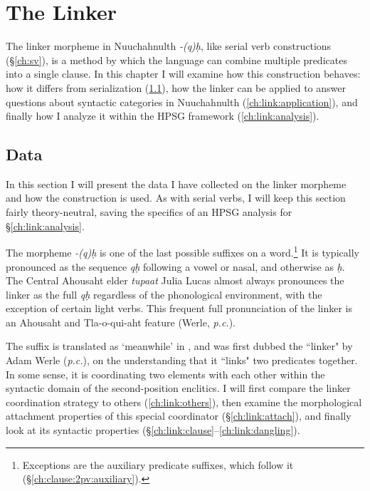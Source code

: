 \chapter{The Linker} \label{ch:link}

The linker morpheme in Nuuchahnulth \textit{-(q)ḥ}, like serial verb constructions (\S\ref{ch:sv}), is a method by which the language can combine multiple predicates into a single clause. In this chapter I will examine how this construction behaves: how it differs from serialization (\ref{ch:link:data}), how the linker can be applied to answer questions about syntactic categories in Nuuchahnulth (\ref{ch:link:application}), and finally how I analyze it within the HPSG framework (\ref{ch:link:analysis}).

\section{Data} \label{ch:link:data}

In this section I will present the data I have collected on the linker morpheme and how the construction is used. As with serial verbs, I will keep this section fairly theory-neutral, saving the specifics of an HPSG analysis for \S\ref{ch:link:analysis}.

The morpheme \textit{-(q)ḥ} is one of the last possible suffixes on a word.\footnote{Exceptions are the auxiliary predicate suffixes, which follow it (\S\ref{ch:clause:2pv:auxiliary}).} It is typically pronounced as the sequence \textit{qḥ} following a vowel or nasal, and otherwise as \textit{ḥ}. The Central Ahousaht elder \textit{tupaat} Julia Lucas almost always pronounces the linker as the full \textit{qḥ} regardless of the phonological environment, with the exception of certain light verbs. This frequent full pronunciation of the linker is an Ahousaht and Tla-o-qui-aht feature (Werle, \textit{p.c.}).

The suffix is translated as `meanwhile' in \citet{sapir1939}, and was first dubbed the ``linker" by Adam Werle (\textit{p.c.}), on the understanding that it ``links" two predicates together. In some sense, it is coordinating two elements with each other within the syntactic domain of the second-position enclitics. I will first compare the linker coordination strategy to others (\ref{ch:link:others}), then examine the morphological attachment properties of this special coordinator (\S\ref{ch:link:attach}), and finally look at its syntactic properties (\S\ref{ch:link:clause}--\ref{ch:link:dangling}).

